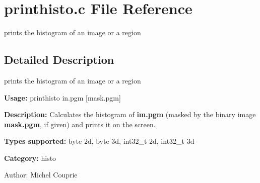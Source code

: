 \section{printhisto.c File Reference}
\label{printhisto_8c}
prints the histogram of an image or a region  




\label{_details}
\subsection{Detailed Description}
prints the histogram of an image or a region 

{\bf Usage:} printhisto in.pgm [mask.pgm]

{\bf Description:} Calculates the histogram of {\bf im.pgm} (masked by the binary image {\bf mask.pgm}, if given) and prints it on the screen.

{\bf Types supported:} byte 2d, byte 3d, int32\_\-t 2d, int32\_\-t 3d

{\bf Category:} histo

\begin{Desc}
\item[Author:]Michel Couprie \end{Desc}
